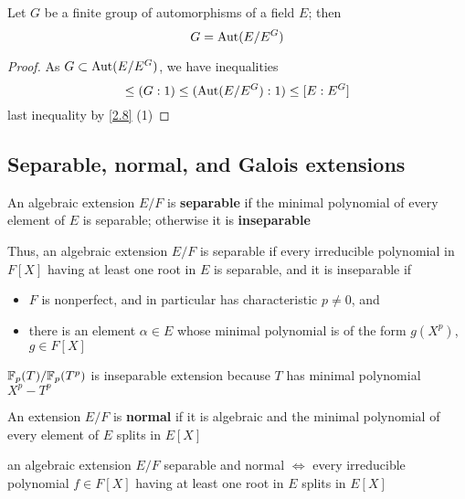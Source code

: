 \documentclass[11pt]{article}
\begin{document}
\begin{corollary}[]
\label{3.5}
Let \(G\) be a finite group of automorphisms of a field \(E\); then
\begin{equation*}
G=\operatorname{\text{Aut}}(E/E^G)
\end{equation*}
\end{corollary}

\begin{proof}
As \(G\subset\operatorname{\text{Aut}}(E/E^G)\), we have inequalities
\begin{equation*}
[E:E^G]\le(G:1)\le(\Aut(E/E^G):1)\le[E:E^G]
\end{equation*}
last inequality by \ref{2.8} (1)
\end{proof}
\subsection{Separable, normal, and Galois extensions}
\label{sec:org3336b2c}
\begin{definition}[]
An algebraic extension \(E/F\) is \textbf{separable} if the minimal polynomial of every element of \(E\)
is separable; otherwise it is \textbf{inseparable}
\end{definition}

Thus, an algebraic extension \(E/F\) is separable if every irreducible polynomial in \(F[X]\)
having at least one root in \(E\) is separable, and it is inseparable if
\begin{itemize}
\item \(F\) is nonperfect, and in particular has characteristic \(p\neq 0\), and
\item there is an element \(\alpha\in E\) whose minimal polynomial is of the form \(g(X^p)\), \(g\in F[X]\)
\end{itemize}


\(\mathbb{F}_p(T)/\mathbb{F}_p(T^p)\) is inseparable extension because \(T\) has minimal polynomial \(X^p-T^p\)


\begin{definition}[]
An extension \(E/F\) is \textbf{normal} if it is algebraic and the minimal polynomial of every element
of \(E\) splits in \(E[X]\)
\end{definition}

an algebraic extension \(E/F\) separable and normal \(\Leftrightarrow\) every irreducible polynomial \(f\in F[X]\) having at least
one root in \(E\) splits in \(E[X]\)
\end{document}
